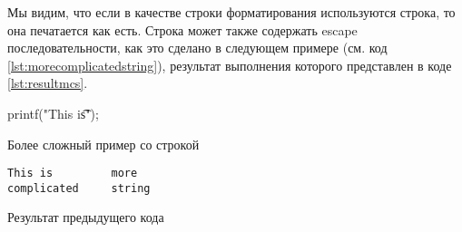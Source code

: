 \documentclass[12pt]{article}
\begin{document}
Мы видим, что если в качестве строки форматирования используются строка, то она печатается как есть. Строка может также содержать escape последовательности, как это сделано в следующем примере (см. код \ref{lst:morecomplicatedstring}), результат выполнения которого представлен в коде \ref{lst:resultmcs}.

\begin{listing}[ht]
\begin{center}
\begin{ccode}
printf("This is\t\tmore\ncomplicated\tstring\n");
\end{ccode}
\end{center}
\caption{Более сложный пример со строкой}
\label{lst:morecomplicatedstring}
\end{listing}

\begin{listing}[ht]
\begin{center}
\begin{verbatim}
This is         more
complicated     string

\end{verbatim}
\end{center}
\caption{Результат предыдущего кода}
\label{lst:resultmcs}
\end{listing}
\end{document}

